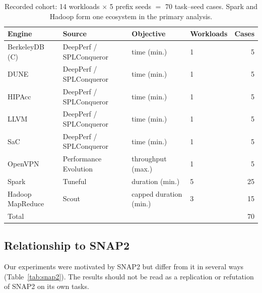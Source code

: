 \begin{table}[t]
\centering
\caption{Recorded cohort: 14 workloads $\times$ 5 prefix seeds $=$ 70 task--seed cases. Spark and Hadoop form one ecosystem in the primary analysis.}
\label{tab:cohort}
\small
\begin{tabular}{llllr}
\toprule
Engine & Source & Objective & Workloads & Cases \\
\midrule
BerkeleyDB (C) & DeepPerf / SPLConqueror & time (min.) & 1 & 5 \\
DUNE & DeepPerf / SPLConqueror & time (min.) & 1 & 5 \\
HIPAcc & DeepPerf / SPLConqueror & time (min.) & 1 & 5 \\
LLVM & DeepPerf / SPLConqueror & time (min.) & 1 & 5 \\
SaC & DeepPerf / SPLConqueror & time (min.) & 1 & 5 \\
OpenVPN & Performance Evolution & throughput (max.) & 1 & 5 \\
Spark & Tuneful & duration (min.) & 5 & 25 \\
Hadoop MapReduce & Scout & capped duration (min.) & 3 & 15 \\
\midrule
Total & & & & 70 \\
\bottomrule
\end{tabular}
\end{table}

\subsection{Relationship to SNAP2}

Our experiments were motivated by SNAP2 but differ from it in several ways (Table~\ref{tab:snap2}). The results should not be read as a replication or refutation of SNAP2 on its own tasks.

